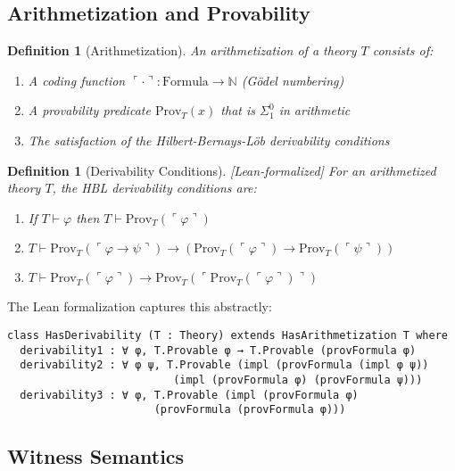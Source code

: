 \documentclass[11pt]{article}
\newtheorem{definition}[theorem]{Definition}
\newcommand{\Prov}{\mathrm{Prov}}
\newcommand{\N}{\mathbb{N}}
\newcommand{\leanok}{\textsf{\textcolor{green!70!black}{[Lean-formalized]}}}
\begin{document}
\subsection{Arithmetization and Provability}

\begin{definition}[Arithmetization]
An \emph{arithmetization} of a theory $T$ consists of:
\begin{enumerate}
\item A coding function $\ulcorner \cdot \urcorner: \text{Formula} \to \N$ (Gödel numbering)
\item A provability predicate $\Prov_T(x)$ that is $\Sigma^0_1$ in arithmetic
\item The satisfaction of the Hilbert-Bernays-Löb derivability conditions
\end{enumerate}
\end{definition}

\begin{definition}[Derivability Conditions] \leanok
For an arithmetized theory $T$, the \emph{HBL derivability conditions} are:
\begin{enumerate}
\item[(D1)] If $T \vdash \varphi$ then $T \vdash \Prov_T(\ulcorner\varphi\urcorner)$
\item[(D2)] $T \vdash \Prov_T(\ulcorner\varphi \to \psi\urcorner) \to (\Prov_T(\ulcorner\varphi\urcorner) \to \Prov_T(\ulcorner\psi\urcorner))$
\item[(D3)] $T \vdash \Prov_T(\ulcorner\varphi\urcorner) \to \Prov_T(\ulcorner\Prov_T(\ulcorner\varphi\urcorner)\urcorner)$
\end{enumerate}
\end{definition}

The Lean formalization captures this abstractly:
\begin{lstlisting}[language=Lean]
class HasDerivability (T : Theory) extends HasArithmetization T where
  derivability1 : ∀ φ, T.Provable φ → T.Provable (provFormula φ)
  derivability2 : ∀ φ ψ, T.Provable (impl (provFormula (impl φ ψ))
                          (impl (provFormula φ) (provFormula ψ)))
  derivability3 : ∀ φ, T.Provable (impl (provFormula φ) 
                       (provFormula (provFormula φ)))
\end{lstlisting}

\subsection{Witness Semantics}
\end{document}
